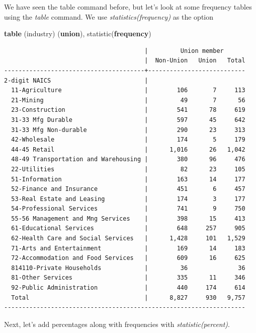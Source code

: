 \documentclass[
]{book}
\newenvironment{Shaded}{\begin{snugshade}}{\end{snugshade}}
\newcommand{\KeywordTok}[1]{\textcolor[rgb]{0.13,0.29,0.53}{\textbf{#1}}}
\newcommand{\NormalTok}[1]{#1}
\begin{document}
We have seen the table command before, but let's look at some frequency tables using the \emph{table} command. We use \emph{statistics(frequency)} as the option

\begin{Shaded}
\begin{Highlighting}[]
\KeywordTok{table}\NormalTok{ (industry) (}\KeywordTok{union}\NormalTok{), statistic(}\KeywordTok{frequency}\NormalTok{) }
\end{Highlighting}
\end{Shaded}

\begin{verbatim}
                                       |         Union member      
                                       |  Non-Union   Union   Total
---------------------------------------+---------------------------
2-digit NAICS                          |                           
  11-Agriculture                       |        106       7     113
  21-Mining                            |         49       7      56
  23-Construction                      |        541      78     619
  31-33 Mfg Durable                    |        597      45     642
  31-33 Mfg Non-durable                |        290      23     313
  42-Wholesale                         |        174       5     179
  44-45 Retail                         |      1,016      26   1,042
  48-49 Transportation and Warehousing |        380      96     476
  22-Utilities                         |         82      23     105
  51-Information                       |        163      14     177
  52-Finance and Insurance             |        451       6     457
  53-Real Estate and Leasing           |        174       3     177
  54-Professional Services             |        741       9     750
  55-56 Management and Mng Services    |        398      15     413
  61-Educational Services              |        648     257     905
  62-Health Care and Social Services   |      1,428     101   1,529
  71-Arts and Entertainment            |        169      14     183
  72-Accommodation and Food Services   |        609      16     625
  814110-Private Households            |         36              36
  81-Other Services                    |        335      11     346
  92-Public Administration             |        440     174     614
  Total                                |      8,827     930   9,757
-------------------------------------------------------------------
\end{verbatim}

Next, let's add percentages along with frequencies with \emph{statistic(percent)}.
\end{document}
